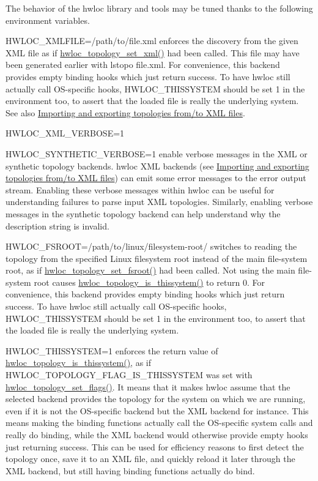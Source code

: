 The behavior of the hwloc library and tools may be tuned thanks to the following environment variables.


\begin{DoxyDescription}
\item[HWLOC\_\-XMLFILE=/path/to/file.xml ]enforces the discovery from the given XML file as if \hyperlink{a00044_ga93efcc8a962afe1ed23393700682173f}{hwloc\_\-topology\_\-set\_\-xml()} had been called. This file may have been generated earlier with lstopo file.xml. For convenience, this backend provides empty binding hooks which just return success. To have hwloc still actually call OS-\/specific hooks, HWLOC\_\-THISSYSTEM should be set 1 in the environment too, to assert that the loaded file is really the underlying system. See also \hyperlink{a00007}{Importing and exporting topologies from/to XML files}. 


\item[HWLOC\_\-XML\_\-VERBOSE=1 ]
\item[HWLOC\_\-SYNTHETIC\_\-VERBOSE=1 ]enable verbose messages in the XML or synthetic topology backends. hwloc XML backends (see \hyperlink{a00007}{Importing and exporting topologies from/to XML files}) can emit some error messages to the error output stream. Enabling these verbose messages within hwloc can be useful for understanding failures to parse input XML topologies. Similarly, enabling verbose messages in the synthetic topology backend can help understand why the description string is invalid. 


\item[HWLOC\_\-FSROOT=/path/to/linux/filesystem-\/root/ ]switches to reading the topology from the specified Linux filesystem root instead of the main file-\/system root, as if \hyperlink{a00044_ga2f6bfb6958d8b508ea1d7d5bb266432c}{hwloc\_\-topology\_\-set\_\-fsroot()} had been called. Not using the main file-\/system root causes \hyperlink{a00046_ga0d109e33fc7990f62f665d336e5e5111}{hwloc\_\-topology\_\-is\_\-thissystem()} to return 0. For convenience, this backend provides empty binding hooks which just return success. To have hwloc still actually call OS-\/specific hooks, HWLOC\_\-THISSYSTEM should be set 1 in the environment too, to assert that the loaded file is really the underlying system. 


\item[HWLOC\_\-THISSYSTEM=1 ]enforces the return value of \hyperlink{a00046_ga0d109e33fc7990f62f665d336e5e5111}{hwloc\_\-topology\_\-is\_\-thissystem()}, as if HWLOC\_\-TOPOLOGY\_\-FLAG\_\-IS\_\-THISSYSTEM was set with \hyperlink{a00044_ga6d11e53db143ac39c32cdb3912b71f99}{hwloc\_\-topology\_\-set\_\-flags()}. It means that it makes hwloc assume that the selected backend provides the topology for the system on which we are running, even if it is not the OS-\/specific backend but the XML backend for instance. This means making the binding functions actually call the OS-\/specific system calls and really do binding, while the XML backend would otherwise provide empty hooks just returning success. This can be used for efficiency reasons to first detect the topology once, save it to an XML file, and quickly reload it later through the XML backend, but still having binding functions actually do bind. 



\end{DoxyDescription}
